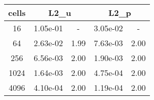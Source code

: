 \documentclass[10pt]{report}
\begin{document}
\begin{table}[H]
\begin{center}
\begin{tabular}{|c|c|c|c|c|} \hline
cells & 
\multicolumn{2}{|c|}{L2_u} & 
\multicolumn{2}{|c|}{L2_p}\\ \hline
16 & 1.05e-01 & - & 3.05e-02 & -\\ \hline
64 & 2.63e-02 & 1.99 & 7.63e-03 & 2.00\\ \hline
256 & 6.56e-03 & 2.00 & 1.90e-03 & 2.00\\ \hline
1024 & 1.64e-03 & 2.00 & 4.75e-04 & 2.00\\ \hline
4096 & 4.10e-04 & 2.00 & 1.19e-04 & 2.00\\ \hline
\end{tabular}
\end{center}
\end{table}
\end{document}
